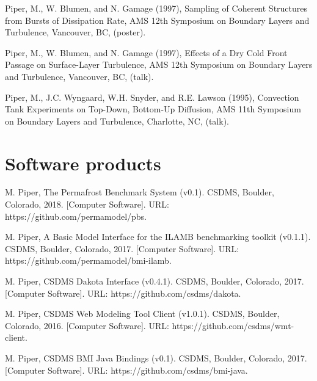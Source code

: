 \documentclass[letterpaper]{resume}
\begin{document}
\begin{enumerate}[{[}1{]}]
  \item Piper, M., W. Blumen, and N. Gamage (1997), Sampling of
    Coherent Structures from Bursts of Dissipation Rate, AMS 12th
    Symposium on Boundary Layers and Turbulence, Vancouver, BC,
    (poster).

  \item Piper, M., W. Blumen, and N. Gamage (1997), Effects of a Dry
    Cold Front Passage on Surface-Layer Turbulence, AMS 12th Symposium
    on Boundary Layers and Turbulence, Vancouver, BC, (talk).

  \item Piper, M., J.C. Wyngaard, W.H. Snyder, and R.E. Lawson (1995),
    Convection Tank Experiments on Top-Down, Bottom-Up Diffusion, AMS
    11th Symposium on Boundary Layers and Turbulence, Charlotte, NC,
    (talk).

\end{enumerate}


\section{Software products}

\vspace{1.0em}
\begin{enumerate}[{[}1{]}]

  \item M. Piper, The Permafrost Benchmark System (v0.1). CSDMS,
    Boulder, Colorado, 2018. [Computer Software]. URL:
    https://github.com/permamodel/pbs.

  \item M. Piper, A Basic Model Interface for the ILAMB benchmarking
    toolkit (v0.1.1). CSDMS, Boulder, Colorado, 2017. [Computer
      Software]. URL: https://github.com/permamodel/bmi-ilamb.

  \item M. Piper, CSDMS Dakota Interface (v0.4.1). CSDMS, Boulder,
    Colorado, 2017. [Computer Software]. URL:
    https://github.com/csdms/dakota.

  \item M. Piper, CSDMS Web Modeling Tool Client (v1.0.1). CSDMS,
    Boulder, Colorado, 2016. [Computer Software]. URL:
    https://github.com/csdms/wmt-client.

 \item M. Piper, CSDMS BMI Java Bindings (v0.1). CSDMS, Boulder,
   Colorado, 2017. [Computer Software]. URL:
   https://github.com/csdms/bmi-java.

\end{enumerate}
\end{document}
